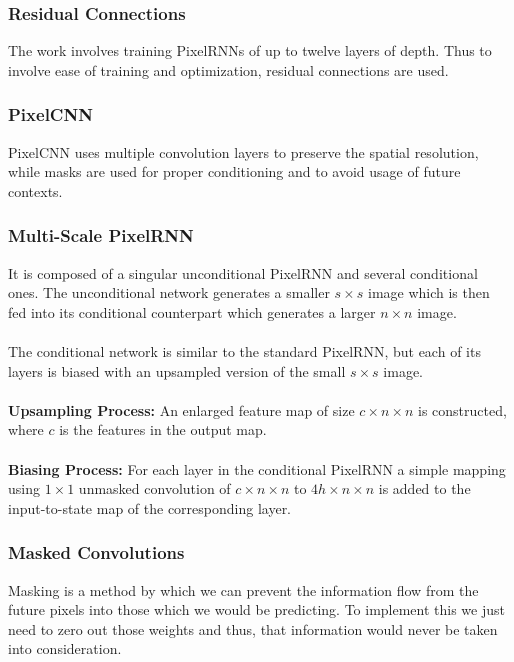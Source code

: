 \documentclass{article}
\begin{document}
\subsubsection{Residual Connections}
The work involves training PixelRNNs of up to twelve layers of depth. Thus to involve ease of training and optimization, residual connections are used.

\subsubsection{PixelCNN}
PixelCNN uses multiple convolution layers to preserve the spatial resolution, while masks are used for proper conditioning and to avoid usage of future contexts.

\subsubsection{Multi-Scale PixelRNN}
It is composed of a singular unconditional PixelRNN and several conditional ones. The unconditional network generates a smaller $ s \times s $ image which is then fed into its conditional counterpart which generates a larger $ n \times n $ image.\\
\\
The conditional network is similar to the standard PixelRNN, but each of its layers is biased with an upsampled version of the small $ s \times s $ image.\\
\\
\textbf{Upsampling Process:} An enlarged feature map of size $ c \times n \times n $ is constructed, where $ c $ is the features in the output map.\\
\\
\textbf{Biasing Process:} For each layer in the conditional PixelRNN a simple mapping using $ 1 \times 1 $ unmasked convolution of $ c \times n \times n $ to $ 4h \times n \times n $ is added to the input-to-state map of the corresponding layer. 









\subsubsection{Masked Convolutions}
Masking is a method by which we can prevent the information flow from the future pixels into those which we would be predicting. To implement this we just need to zero out those weights and thus, that information would never be taken into consideration.
\end{document}
